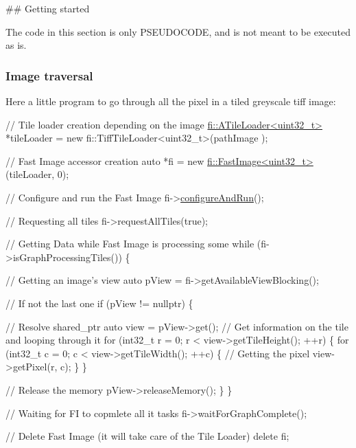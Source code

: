 \#\# Getting started 
\begin{DoxyCode}
The code in this section is only PSEUDOCODE, and is not meant to be executed as is.
\end{DoxyCode}


\subsubsection*{Image traversal}

Here a little program to go through all the pixel in a tiled greyscale tiff image\+: 
\begin{DoxyCode}
\textcolor{comment}{// Tile loader creation depending on the image}
\hyperlink{classfi_1_1ATileLoader}{fi::ATileLoader<uint32\_t>} *tileLoader = \textcolor{keyword}{new} fi::TiffTileLoader<uint32\_t>(pathImage
      ); 

\textcolor{comment}{// Fast Image accessor creation}
\textcolor{keyword}{auto} *fi = \textcolor{keyword}{new} \hyperlink{classfi_1_1FastImage}{fi::FastImage<uint32\_t>}(tileLoader, 0);

\textcolor{comment}{// Configure and run the Fast Image}
fi->\hyperlink{classfi_1_1FastImage_aa2ae5e5498f57462abd876108a55475c}{configureAndRun}();

\textcolor{comment}{// Requesting all tiles }
fi->requestAllTiles(\textcolor{keyword}{true});

\textcolor{comment}{// Getting Data while Fast Image is processing some}
\textcolor{keywordflow}{while} (fi->isGraphProcessingTiles()) \{

    \textcolor{comment}{// Getting an image's view }
    \textcolor{keyword}{auto} pView = fi->getAvailableViewBlocking();

    \textcolor{comment}{// If not the last one}
    \textcolor{keywordflow}{if} (pView != \textcolor{keyword}{nullptr}) \{

        \textcolor{comment}{// Resolve shared\_ptr}
        \textcolor{keyword}{auto} view = pView->get();
        \textcolor{comment}{// Get information on the tile and looping through it }
        \textcolor{keywordflow}{for} (int32\_t r = 0; r < view->getTileHeight(); ++r) \{
            \textcolor{keywordflow}{for} (int32\_t c = 0; c < view->getTileWidth(); ++c) \{
                \textcolor{comment}{// Getting the pixel}
                view->getPixel(r, c);
            \}
        \}

        \textcolor{comment}{// Release the memory}
        pView->releaseMemory();
    \}
\}

\textcolor{comment}{// Waiting for FI to copmlete all it tasks}
fi->waitForGraphComplete();

\textcolor{comment}{// Delete Fast Image (it will take care of the Tile Loader)}
\textcolor{keyword}{delete} fi;
\end{DoxyCode}


